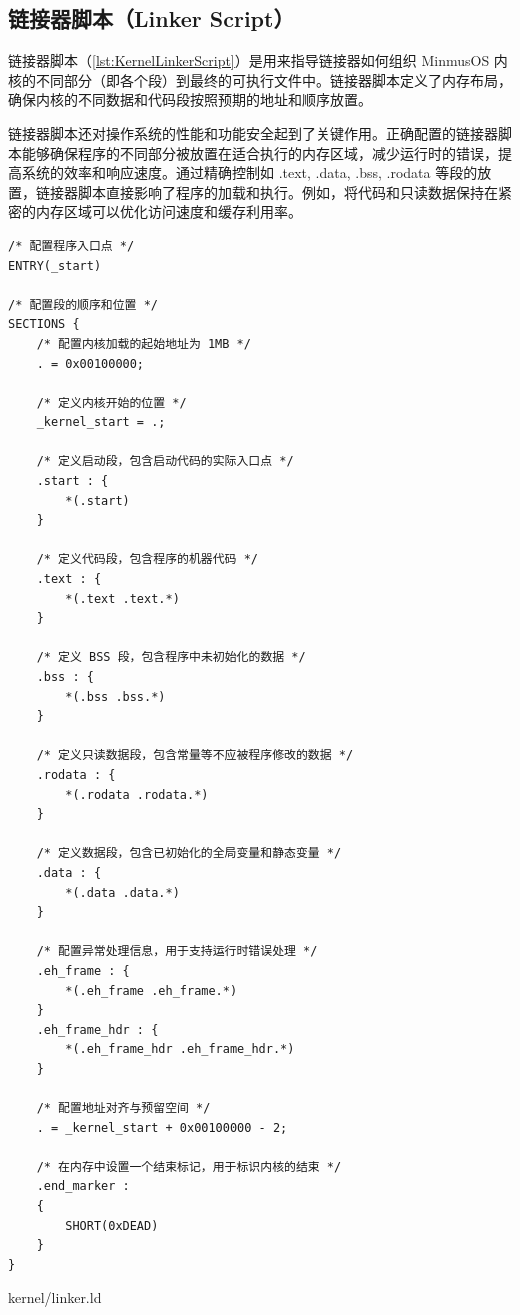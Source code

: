 \subsection{链接器脚本（Linker Script）}

链接器脚本（\cref{lst:KernelLinkerScript}）是用来指导链接器如何组织 MinmusOS 内核的不同部分（即各个段）到最终的可执行文件中。链接器脚本定义了内存布局，确保内核的不同数据和代码段按照预期的地址和顺序放置。

链接器脚本还对操作系统的性能和功能安全起到了关键作用。正确配置的链接器脚本能够确保程序的不同部分被放置在适合执行的内存区域，减少运行时的错误，提高系统的效率和响应速度。通过精确控制如 .text, .data, .bss, .rodata 等段的放置，链接器脚本直接影响了程序的加载和执行。例如，将代码和只读数据保持在紧密的内存区域可以优化访问速度和缓存利用率。

\begin{listing}[htbp]
    \begin{verbatim}
/* 配置程序入口点 */
ENTRY(_start)

/* 配置段的顺序和位置 */
SECTIONS {
    /* 配置内核加载的起始地址为 1MB */
    . = 0x00100000;

    /* 定义内核开始的位置 */
    _kernel_start = .;

    /* 定义启动段，包含启动代码的实际入口点 */
    .start : {
        *(.start)
    }

    /* 定义代码段，包含程序的机器代码 */
    .text : {
        *(.text .text.*)
    }

    /* 定义 BSS 段，包含程序中未初始化的数据 */
    .bss : {
        *(.bss .bss.*)
    }

    /* 定义只读数据段，包含常量等不应被程序修改的数据 */
    .rodata : {
        *(.rodata .rodata.*)
    }

    /* 定义数据段，包含已初始化的全局变量和静态变量 */
    .data : {
        *(.data .data.*)
    }

    /* 配置异常处理信息，用于支持运行时错误处理 */
    .eh_frame : {
        *(.eh_frame .eh_frame.*)
    }
    .eh_frame_hdr : {
        *(.eh_frame_hdr .eh_frame_hdr.*)
    }

    /* 配置地址对齐与预留空间 */
    . = _kernel_start + 0x00100000 - 2;

    /* 在内存中设置一个结束标记，用于标识内核的结束 */
    .end_marker :
    {
        SHORT(0xDEAD)
    }
}
    \end{verbatim}
    \caption{kernel/linker.ld}\label{lst:KernelLinkerScript}
\end{listing}

